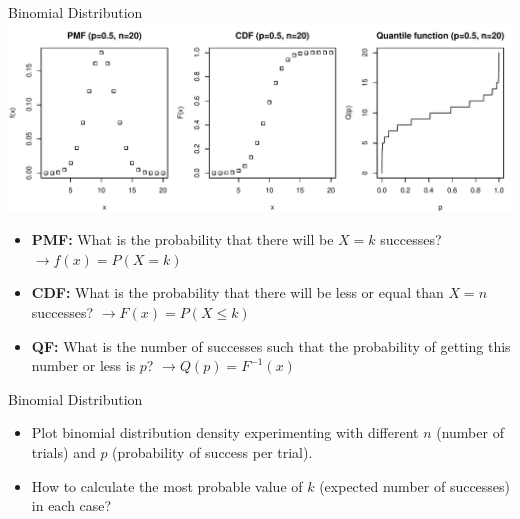 \begin{frame}{Binomial Distribution}
    \includegraphics[width=0.95\linewidth]{R/plots/density-cumulative-quantile}
    \begin{itemize}
        \item \textbf{PMF:} What is the probability that there will be $X=k$ successes? $\rightarrow f(x) = P(X=k)$
        \item \textbf{CDF:} What is the probability that there will be less or equal than $X=n$ successes? $\rightarrow F(x) = P(X \leq k)$
        \item \textbf{QF:} What is the number of successes such that the probability of getting this number or less is $p$? $\rightarrow Q(p) = F^{-1}(x)$
    \end{itemize}
\end{frame}

\begin{frame}{Binomial Distribution}
    \begin{example}
        \medskip
        \begin{itemize}
            \item Plot binomial distribution density experimenting with different $n$ (number of trials) and $p$ (probability of success per trial).
            \item How to calculate the most probable value of $k$ (expected number of successes) in each case?
        \end{itemize}
    \end{example}
\end{frame}

